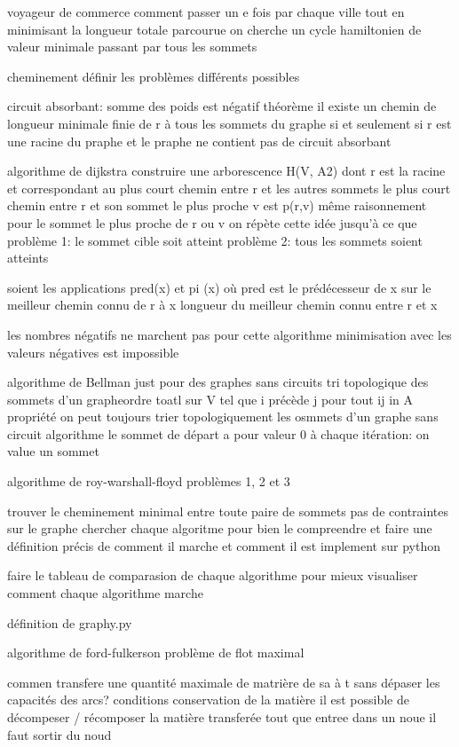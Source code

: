\documentclass{article}
\begin{document}
voyageur de commerce
comment passer un e fois par chaque ville tout en minimisant la longueur totale parcourue
on cherche un cycle hamiltonien de valeur minimale
passant par tous les sommets


cheminement
définir les problèmes différents possibles


circuit absorbant: somme des poids est négatif
théorème il existe un chemin de longueur minimale finie de r à tous les sommets du graphe
si et seulement si r est une racine du praphe et le praphe ne contient pas de circuit absorbant

algorithme de dijkstra
construire une arborescence H(V, A2) dont r est la racine et correspondant au plus court chemin entre r et les autres sommets
le plus court chemin entre r et son sommet le plus proche v est p(r,v)
même raisonnement pour le sommet le plus proche de r ou v
on répète cette idée jusqu'à ce que
    problème 1: le sommet cible soit atteint
    problème 2: tous les sommets soient atteints

soient les applications pred(x) et pi (x)
    où pred est le prédécesseur de x sur le meilleur chemin connu de r à x
    longueur du meilleur chemin connu entre r et x

    les nombres négatifs ne marchent pas pour cette algorithme
    minimisation avec les valeurs négatives est impossible



algorithme de Bellman
just pour des graphes sans circuits
tri topologique des sommets d'un grapheordre toatl sur V tel que i précède j pour tout ij in A
propriété on peut toujours trier topologiquement les osmmets d'un graphe sans circuit
algorithme
    le sommet de départ a pour valeur 0
    à chaque itération: on value un sommet


algorithme de roy-warshall-floyd
problèmes 1, 2 et 3

trouver le cheminement minimal entre toute paire de sommets pas de contraintes sur le graphe
chercher chaque algoritme pour bien le compreendre et faire une définition précis de comment il marche et comment il est implement sur python


faire le tableau de comparasion de chaque algorithme pour mieux visualiser comment chaque algorithme marche


définition de graphy.py


algorithme de ford-fulkerson
problème de flot maximal

commen transfere une quantité maximale de matrière de sa à t sans dépaser les capacités des arcs?
conditions
    conservation de la matière
    il est possible de décompeser / récomposer la matière transferée
        tout que entree dans un noue il faut sortir du noud
\end{document}
